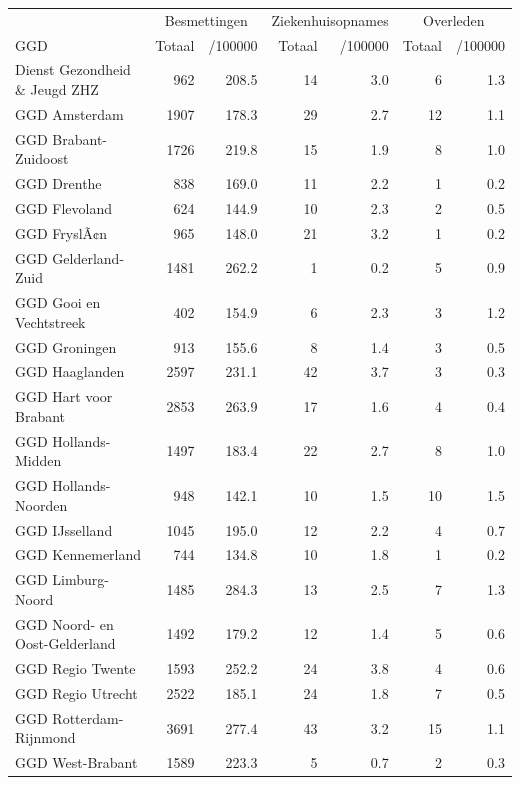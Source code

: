 \documentclass[
  english,
  man,floatsintext]{apa6}
\begin{document}
\begin{table}
\centering\begingroup\fontsize{10}{12}\selectfont

\begin{threeparttable}
\begin{tabular}{lrrrrrr}
\toprule
\multicolumn{1}{c}{ } & \multicolumn{2}{c}{Besmettingen} & \multicolumn{2}{c}{Ziekenhuisopnames} & \multicolumn{2}{c}{Overleden} \\
\cmidrule(l{3pt}r{3pt}){2-3} \cmidrule(l{3pt}r{3pt}){4-5} \cmidrule(l{3pt}r{3pt}){6-7}
GGD & Totaal & /100000 & Totaal & /100000 & Totaal & /100000\\
\midrule
Dienst Gezondheid \& Jeugd ZHZ & 962 & 208.5 & 14 & 3.0 & 6 & 1.3\\
GGD Amsterdam & 1907 & 178.3 & 29 & 2.7 & 12 & 1.1\\
GGD Brabant-Zuidoost & 1726 & 219.8 & 15 & 1.9 & 8 & 1.0\\
GGD Drenthe & 838 & 169.0 & 11 & 2.2 & 1 & 0.2\\
GGD Flevoland & 624 & 144.9 & 10 & 2.3 & 2 & 0.5\\
GGD FryslÃ¢n & 965 & 148.0 & 21 & 3.2 & 1 & 0.2\\
GGD Gelderland-Zuid & 1481 & 262.2 & 1 & 0.2 & 5 & 0.9\\
GGD Gooi en Vechtstreek & 402 & 154.9 & 6 & 2.3 & 3 & 1.2\\
GGD Groningen & 913 & 155.6 & 8 & 1.4 & 3 & 0.5\\
GGD Haaglanden & 2597 & 231.1 & 42 & 3.7 & 3 & 0.3\\
GGD Hart voor Brabant & 2853 & 263.9 & 17 & 1.6 & 4 & 0.4\\
GGD Hollands-Midden & 1497 & 183.4 & 22 & 2.7 & 8 & 1.0\\
GGD Hollands-Noorden & 948 & 142.1 & 10 & 1.5 & 10 & 1.5\\
GGD IJsselland & 1045 & 195.0 & 12 & 2.2 & 4 & 0.7\\
GGD Kennemerland & 744 & 134.8 & 10 & 1.8 & 1 & 0.2\\
GGD Limburg-Noord & 1485 & 284.3 & 13 & 2.5 & 7 & 1.3\\
GGD Noord- en Oost-Gelderland & 1492 & 179.2 & 12 & 1.4 & 5 & 0.6\\
GGD Regio Twente & 1593 & 252.2 & 24 & 3.8 & 4 & 0.6\\
GGD Regio Utrecht & 2522 & 185.1 & 24 & 1.8 & 7 & 0.5\\
GGD Rotterdam-Rijnmond & 3691 & 277.4 & 43 & 3.2 & 15 & 1.1\\
GGD West-Brabant & 1589 & 223.3 & 5 & 0.7 & 2 & 0.3\\

\end{tabular}
\end{threeparttable}
\end{table}
\end{document}
